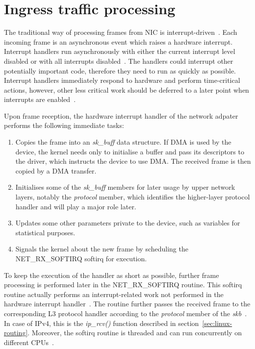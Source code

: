 
\section{Ingress traffic processing}\label{sec:linux-ingress}
The traditional way of processing frames from NIC is interrupt-driven~\cite{linux-kernel-networking}.
Each incoming frame is an asynchronous event which raises a hardware interrupt.
Interrupt handlers run asynchronously with either the current interrupt level disabled or with all
interrupts disabled~\cite{lkd2}.
The handlers could interrupt other potentially important code, therefore they need to run as quickly as possible.
Interrupt handlers immediately respond to hardware and perform time-critical actions,
however, other less critical work should be deferred to a later point when interrupts are enabled~\cite{lkd2}.

Upon frame reception, the hardware interrupt handler of the network adpater
performs the following immediate tasks:~\cite{understanding-internals}
\begin{enumerate}
\item Copies the frame into an {\it{sk\_buff}} data structure.
If DMA is used by the device, the kernel needs only to initialise a buffer and pass its descriptors to the driver,
which instructs the device to use DMA.
The received frame is then copied by a DMA transfer.
\item Initialises some of the {\it{sk\_buff}} members for later usage by upper network layers,
notably the {\it{protocol}} member, which identifies the higher-layer protocol handler and will play a major role later.
\item Updates some other parameters private to the device, such as variables for statistical purposes.
\item Signals the kernel about the new frame by scheduling the NET\_RX\_SOFTIRQ softirq for execution.
\end{enumerate}

To keep the execution of the handler as short as possible,
further frame processing is performed later in the NET\_RX\_SOFTIRQ routine.
This softirq routine actually performs an interrupt-related work
not performed in the hardware interrupt handler~\cite{understanding-internals}.
The routine further passes the received frame
to the corresponding L3 protocol handler according to the {\it{protocol}} member of the {\it{skb}}~\cite{lkd2}.
In case of IPv4, this is the {\it{ip\_rcv()}} function described in section~\ref{sec:linux-routing}.
Moreover, the softirq routine is threaded and can run concurrently on different CPUs~\cite{lkd2}.

